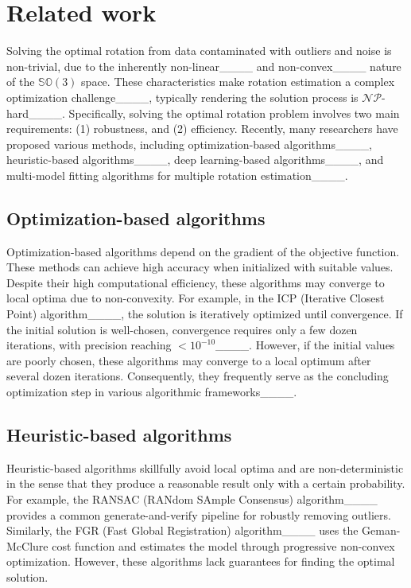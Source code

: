 \section{Related work}
Solving the optimal rotation from data contaminated with outliers and noise is non-trivial, due to the inherently non-linear____ and non-convex____ nature of the \(\mathbb{SO}(3)\) space. These characteristics make rotation estimation a complex optimization challenge____, typically rendering the solution process is \(\mathcal{NP}\)-hard____. Specifically, solving the optimal rotation problem involves two main requirements: (1) robustness, and (2) efficiency. Recently, many researchers have proposed various methods, including optimization-based algorithms____, heuristic-based algorithms____, deep learning-based algorithms____, and multi-model fitting algorithms for multiple rotation estimation____.
\subsection{Optimization-based algorithms}
Optimization-based algorithms depend on the gradient of the objective function. These methods can achieve high accuracy when initialized with suitable values. Despite their high computational efficiency, these algorithms may converge to local optima due to non-convexity. For example, in the ICP (Iterative Closest Point) algorithm____, the solution is iteratively optimized until convergence. If the initial solution is well-chosen, convergence requires only a few dozen iterations, with precision reaching \(<10^{-10}\)____. However, if the initial values are poorly chosen, these algorithms may converge to a local optimum after several dozen iterations. Consequently, they frequently serve as the concluding optimization step in various algorithmic frameworks____.
\subsection{Heuristic-based algorithms}
Heuristic-based algorithms skillfully avoid local optima and are non-deterministic in the sense that they produce a reasonable result only with a certain probability. For example, the RANSAC (RANdom SAmple Consensus) algorithm____ provides a common generate-and-verify pipeline for robustly removing outliers. Similarly, the FGR (Fast Global Registration) algorithm____ uses the Geman-McClure cost function and estimates the model through progressive non-convex optimization. However, these algorithms lack guarantees for finding the optimal solution.
